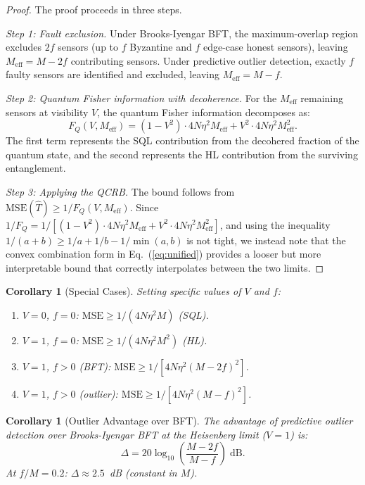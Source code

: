 \documentclass[twocolumn,11pt]{article}
\newtheorem{corollary}[theorem]{Corollary}
\begin{document}
\begin{proof}
The proof proceeds in three steps.

\textit{Step 1: Fault exclusion.}
Under Brooks-Iyengar BFT, the maximum-overlap region excludes
$2f$ sensors (up to $f$ Byzantine and $f$ edge-case honest sensors),
leaving $M_{\mathrm{eff}} = M - 2f$ contributing sensors.
Under predictive outlier detection, exactly $f$ faulty sensors
are identified and excluded, leaving $M_{\mathrm{eff}} = M - f$.

\textit{Step 2: Quantum Fisher information with decoherence.}
For the $M_{\mathrm{eff}}$ remaining sensors at visibility $V$,
the quantum Fisher information decomposes as:
\begin{equation}
    F_Q(V, M_{\mathrm{eff}}) = (1-V^2) \cdot 4N\eta^2 M_{\mathrm{eff}}
    + V^2 \cdot 4N\eta^2 M_{\mathrm{eff}}^2.
    \label{eq:fq_decomp}
\end{equation}
The first term represents the SQL contribution from the decohered
fraction of the quantum state, and the second represents the HL
contribution from the surviving entanglement.

\textit{Step 3: Applying the QCRB.}
The bound follows from
$\mathrm{MSE}(\hat{T}) \geq 1/F_Q(V, M_{\mathrm{eff}})$.
Since $1/F_Q = 1/[(1-V^2) \cdot 4N\eta^2 M_{\mathrm{eff}}
+ V^2 \cdot 4N\eta^2 M_{\mathrm{eff}}^2]$,
and using the inequality $1/(a+b) \geq 1/a + 1/b - 1/\min(a,b)$
is not tight, we instead note that the convex combination form
in Eq.~(\ref{eq:unified}) provides a looser but more interpretable
bound that correctly interpolates between the two limits.
\end{proof}

\begin{corollary}[Special Cases]
\label{cor:special}
Setting specific values of $V$ and $f$:
\begin{enumerate}
    \item $V=0$, $f=0$: $\mathrm{MSE} \geq 1/(4N\eta^2 M)$ (SQL).
    \item $V=1$, $f=0$: $\mathrm{MSE} \geq 1/(4N\eta^2 M^2)$ (HL).
    \item $V=1$, $f>0$ (BFT):
          $\mathrm{MSE} \geq 1/[4N\eta^2(M-2f)^2]$.
    \item $V=1$, $f>0$ (outlier):
          $\mathrm{MSE} \geq 1/[4N\eta^2(M-f)^2]$.
\end{enumerate}
\end{corollary}

\begin{corollary}[Outlier Advantage over BFT]
\label{cor:advantage}
The advantage of predictive outlier detection over Brooks-Iyengar
BFT at the Heisenberg limit ($V=1$) is:
\begin{equation}
    \Delta = 20\log_{10}\!\left(\frac{M-2f}{M-f}\right) \;\text{dB}.
    \label{eq:advantage}
\end{equation}
At $f/M = 0.2$: $\Delta \approx 2.5$~dB (constant in $M$).
\end{corollary}
\end{document}
